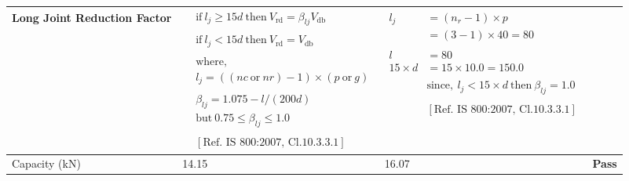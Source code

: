 \documentclass{article}%
\begin{document}
\begin{longtable}{|p{3.5cm}|p{5.3cm}|p{6.7cm}|p{1.5cm}|}
Long Joint Reduction Factor&$\begin{aligned} & \text{if} ~l_j\geq 15 d~\text{then}~V_{\text{rd}} = \beta_{lj} V_{\text{db}} \\ \\ & \text{if}~l_j < 15 d~\text{then}~V_{\text{rd}} = V_{\text{db}} \\ \\ & \text{where},\\ & l_j = ((nc~\text{or}~nr) - 1) \times (p~\text{or}~g) \\ \\ & \beta_{lj} = 1.075 - l/(200 d) \\ & \text{but}~0.75\leq\beta_{lj}\leq1.0 \\ \\ & [\text{Ref. IS 800:2007, Cl.10.3.3.1}] \end{aligned}$&$\begin{aligned} l_j &= (n_r - 1) \times  p \\  &= (3 - 1) \times 40=80\\ \\  l&= 80\\  15 \times d &= 15 \times 10.0 = 150.0 \\ \\ & \text{since},~l_j < 15 \times d~\text{then}~\beta_{lj} = 1.0 \\ \\ &[ \text{Ref. IS 800:2007, Cl.10.3.3.1}] \end{aligned}$&\textcolor{OsdagGreen}{ 
\textbf{}
}\\%
\hline%
Capacity (kN)&14.15&16.07&\textcolor{OsdagGreen}{ 
\textbf{Pass}
}\\%
\hline%
\end{longtable}

%
%
\end{document}
